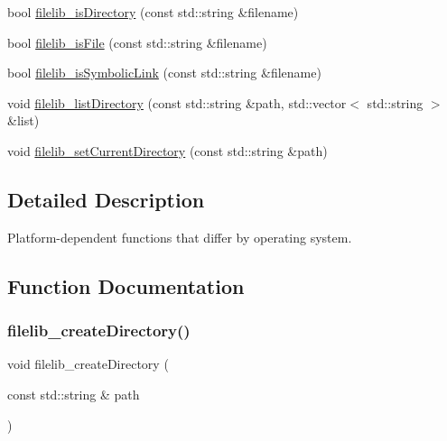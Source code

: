 \begin{DoxyCompactItemize}
\item 
bool \mbox{\hyperlink{namespacesgl_1_1priv_1_1filelib_1_1platform_a68319ac7586223f385d7785f1b38e1b9}{filelib\+\_\+is\+Directory}} (const std\+::string \&filename)
\item 
bool \mbox{\hyperlink{namespacesgl_1_1priv_1_1filelib_1_1platform_aca0d9e2b4896bfd0f7a5cd64049188fc}{filelib\+\_\+is\+File}} (const std\+::string \&filename)
\item 
bool \mbox{\hyperlink{namespacesgl_1_1priv_1_1filelib_1_1platform_a69dc63b6fb991650c05dde15b04ca465}{filelib\+\_\+is\+Symbolic\+Link}} (const std\+::string \&filename)
\item 
void \mbox{\hyperlink{namespacesgl_1_1priv_1_1filelib_1_1platform_acad9142fb05b5756d75b8f8a68b5558b}{filelib\+\_\+list\+Directory}} (const std\+::string \&path, std\+::vector$<$ std\+::string $>$ \&list)
\item 
void \mbox{\hyperlink{namespacesgl_1_1priv_1_1filelib_1_1platform_afe79a966d14e3b8d08939712884fa9d3}{filelib\+\_\+set\+Current\+Directory}} (const std\+::string \&path)
\end{DoxyCompactItemize}


\subsection{Detailed Description}
Platform-\/dependent functions that differ by operating system. 

\subsection{Function Documentation}
\mbox{\label{namespacesgl_1_1priv_1_1filelib_1_1platform_aa30655cd42c277a7c5ed7aba21cf0050}} 
\subsubsection{\texorpdfstring{filelib\+\_\+create\+Directory()}{filelib\_createDirectory()}}
{\footnotesize\ttfamily void filelib\+\_\+create\+Directory (\begin{DoxyParamCaption}\item[{const std\+::string \&}]{path }\end{DoxyParamCaption})}

